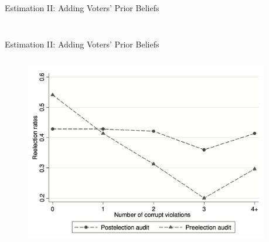 \begin{frame}{Estimation II: Adding Voters' Prior Beliefs}
\begin{columns}
\begin{column}{0.55\textwidth}
{            }
        
        \end{column}

    \end{columns}

\end{frame}

\begin{frame}{Estimation II: Adding Voters' Prior Beliefs}

    \begin{columns}

        \begin{column}{0.4\textwidth}
            \begin{figure}
            \centering
            \includegraphics[height = 0.55 \textheight]{images/fig3.png}
            \end{figure}
        \end{column}

        \begin{column}{0.5\textwidth}

\end{column}
\end{columns}
\end{frame}
